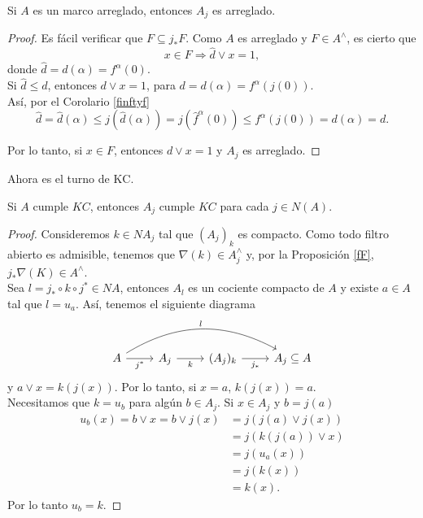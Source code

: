 \begin{prop}\label{tidyquout}
    Si $A$ es un marco arreglado, entonces $A_j$ es arreglado.
\end{prop}

\begin{proof}
Es fácil verificar que $F\subseteq j_*F$. Como $A$ es arreglado y $F\in A^\wedge$, es cierto que 
\[
x\in F\Rightarrow \hat{d}\vee x=1,
\]
donde $\hat{d}=d(\alpha)=f^\alpha(0)$.\\
Si $\hat{d}\leq d$, entonces $d\vee x=1$, para $d=d(\alpha)=f^\alpha(j(0))$.\\

Así, por el Corolario \ref{finftyf}
\[
\hat{d}=\hat{d}(\alpha)\leq j(\hat{d}(\alpha))=j(\hat{f}^\alpha(0))\leq f^\alpha(j(0))=d(\alpha)=d.
\]

Por lo tanto, si $x\in F$, entonces $d\vee x=1$ y $A_j$ es arreglado.
\end{proof}

Ahora es el turno de $\mathrm{KC}$.
\begin{prop}\label{KCquout}
    Si $A$ cumple $KC$, entonces $A_j$ cumple $KC$ para cada $j\in N(A).$
\end{prop}

\begin{proof}
Consideremos $k\in NA_j$ tal que $(A_j)_k$ es compacto. 
Como todo filtro abierto es admisible, tenemos que $\nabla(k)\in A_j^\wedge$ 
y, por la Proposición \ref{fF}, $j_*\nabla(K)\in A^\wedge$.\\

Sea $l=j_*\circ  k\circ j^*\in NA$, entonces $A_l$ es un cociente compacto de $A$ y existe $a\in A$ tal que $l=u_a$. Así, tenemos el siguiente diagrama 
\[
\begin{tikzcd}
	A \arrow[r, "j^*"'] \arrow[rrr, "l", bend left] & A_j \arrow[r, "k"'] & (A_j)_k \arrow[r, "j_*"'] & A_j\subseteq A
	\end{tikzcd}\]
y $a\vee x=k(j(x))$. Por lo tanto, si $x=a$, $k(j(x))=a$.\\

Necesitamos que $k=u_b$ para algún $b\in A_j$. Si $x\in A_j$ y $b=j(a)$
\[
\begin{split}
u_b(x)= b\vee x= b\vee j(x)& =j(j(a)\vee j(x))\\
& =j(k(j(a))\vee x)\\
& =j(u_a(x))\\
& =j(k(x))\\	
&=k(x).
\end{split}
\]
Por lo tanto $u_b=k$.
\end{proof}

